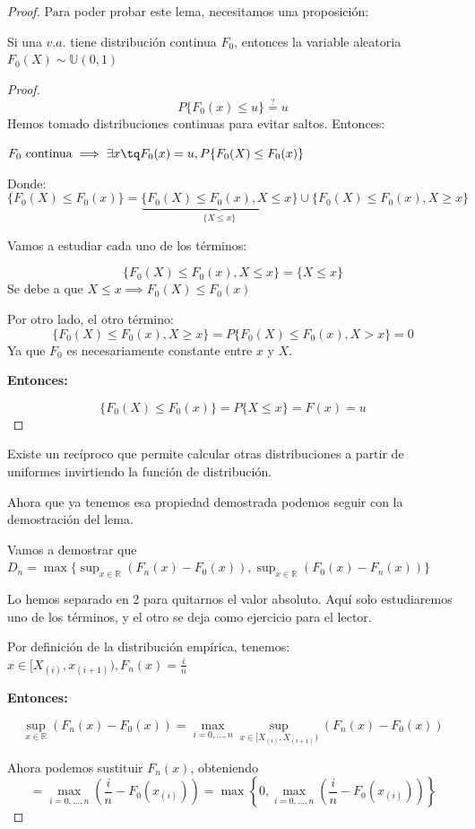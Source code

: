 \begin{proof}
Para poder probar este lema, necesitamos una proposición:

\begin{prop}
Si una $v.a.$ tiene distribución continua $F_0$, entonces la variable aleatoria $F_0(X)\sim \mathbb{U}(0,1)$\label{prop::funcionsobredistribucioncontinua}
\end{prop}
\begin{proof}
\[
P\{F_0(x) \leq u\} \overset{?}{=} u 
\]
Hemos tomado distribuciones continuas para evitar saltos. Entonces:

$F_0 \text{ continua} \implies \exists x \tq F_0(x) = u, P\{F_0(X)\leq F_0(x)\}$

Donde:
\[
\{F_0(X)\leq F_0(x)\} = \underbrace{\{F_0(X)\leq F_0(x), X\leq x\}}_{\{X\leq x\}} \cup \{F_0(X)\leq F_0(x), X\ge x\}
\]

Vamos a estudiar cada uno de los términos:

\[\{F_0(X)\leq F_0(x), X\leq x\} = \{X\leq x\}\]
Se debe a que $X\leq x \implies F_0(X)\leq F_0(x)$

Por otro lado, el otro término:
\[\{F_0(X)\leq F_0(x), X\ge x\} = P\{F_0(X)\leq F_0(x), X>x\} = 0\]
Ya que $F_0$ es necesariamente constante entre $x$ y $X$.


\textbf{Entonces:}

\[
\{F_0(X)\leq F_0(x)\} = P\{X\leq x\} = F(x) = u
\]
\end{proof}
\obs Existe un recíproco que permite calcular otras distribuciones a partir de uniformes invirtiendo la función de distribución.


Ahora que ya tenemos esa propiedad demostrada podemos seguir con la demostración del lema.

Vamos a demostrar que $D_n = \max\{\sup_{x\in ℝ} (F_n(x) - F_0(x)),\sup_{x\in ℝ} (F_0(x) - F_n(x)) \}$

Lo hemos separado en 2 para quitarnos el valor absoluto. Aquí solo estudiaremos uno de los términos, y el otro se deja como ejercicio para el lector.

Por definición de la distribución empírica, tenemos: $x\in [X_{(i)},x_{(i+1)}), F_n(x) = \frac{i}{n}$

\textbf{Entonces:}

\[
\sup_{x\in ℝ} (F_n(x) - F_0(x)) = \max_{i=0,...,n} \sup_{x\in [X_{(i)},X_{(i+1)})} (F_n(x) - F_0(x))
\]


Ahora podemos sustituir $F_n(x)$, obteniendo
\[
 = \max_{i=0,...,n} \left( \frac{i}{n} - F_0(x_{(i)})\right) = \max \left\{0,\max_{i=0,...,n} \left( \frac{i}{n} - F_0(x_{(i)})\right)\right\}
\]


\end{proof}
